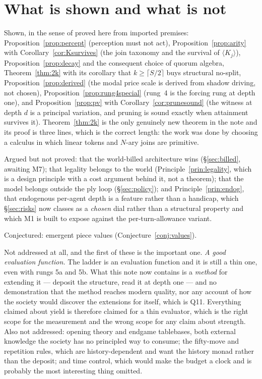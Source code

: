 \documentclass[11pt,a4paper]{article}
\theoremstyle{plain}
\theoremstyle{definition}
\theoremstyle{remark}
\newcommand{\Kmod}[1]{\langle K_{#1}\rangle}
\begin{document}
\section{What is shown and what is not}
\label{sec:shown}

Shown, in the sense of proved here from imported premises:
Proposition~\ref{prop:percept} (perception must not act),
Proposition~\ref{prop:arity} with Corollary~\ref{cor:Ksurvives} (the join
taxonomy and the survival of $\Kmod{j}$), Proposition~\ref{prop:decay} and the
consequent choice of quorum algebra, Theorem~\ref{thm:2k} with its corollary
that $k \geq \lceil S/2 \rceil$ buys structural no-split,
Proposition~\ref{prop:derived} (the modal price scale is derived from shadow
driving, not chosen), Proposition~\ref{prop:rung4special} (rung~4 is the
forcing rung at depth one), and Proposition~\ref{prop:pv} with
Corollary~\ref{cor:prunesound} (the witness at depth $d$ is a principal
variation, and pruning is sound exactly when attainment survives it).
Theorem~\ref{thm:2k} is the only genuinely new theorem in the note and its proof
is three lines, which is the correct length: the work was done by choosing a
calculus in which linear tokens and $N$-ary joins are primitive.

Argued but not proved: that the world-billed architecture wins
(\S\ref{sec:billed}, awaiting M7); that legality belongs to the world
(Principle~\ref{prin:legality}, which is a design principle with a cost argument
behind it, not a theorem); that the model belongs outside the ply loop
(\S\ref{sec:policy}); and Principle~\ref{prin:endog}, that endogenous
per-agent depth is a feature rather than a handicap, which \S\ref{sec:risks}
now classes as a \emph{chosen} dial rather than a structural property and which
M1 is built to expose against the per-turn-allowance variant.

Conjectured: emergent piece values (Conjecture~\ref{conj:values}).

Not addressed at all, and the first of these is the important one. \emph{A good
evaluation function.} The ladder is an evaluation function and it is still a thin
one, even with rungs 5a and 5b. What this note now contains is a
\emph{method} for extending it --- deposit the structure, read it at depth one
--- and no demonstration that the method reaches modern quality, nor any account
of how the society would discover the extensions for itself, which is Q11.
Everything claimed about yield is therefore claimed for a thin evaluator, which
is the right scope for the measurement and the wrong scope for any claim about
strength. Also not addressed: opening theory and endgame tablebases, both
external knowledge the society has no principled way to consume; the fifty-move
and repetition rules, which are history-dependent and want the history monad
rather than the deposit; and time control, which would make the budget a clock
and is probably the most interesting thing omitted.
\end{document}
